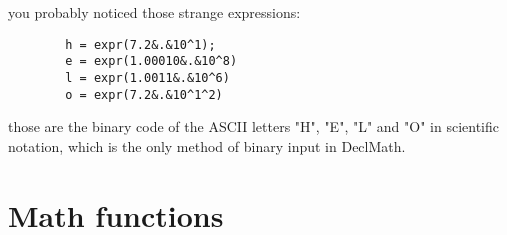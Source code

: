 \documentclass{book}
\begin{document}
    you probably noticed those strange expressions:
    \begin{lstlisting}
        h = expr(7.2&.&10^1);
        e = expr(1.00010&.&10^8)
        l = expr(1.0011&.&10^6)
        o = expr(7.2&.&10^1^2)
    \end{lstlisting}

    those are the binary code of the ASCII letters "H", "E", "L" and "O"
    in scientific notation, which is the only method of binary input in DeclMath.

    \chapter{Math functions}
    
\end{document}
